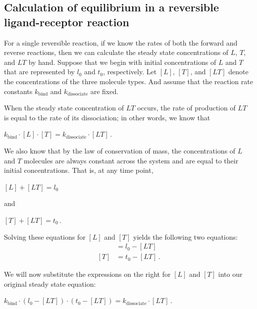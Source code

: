\FloatBarrier
{}
\subsection{Calculation of equilibrium in a reversible ligand-receptor reaction}

For a single reversible reaction, if we know the rates of both the forward and reverse reactions, then we can calculate the steady state concentrations of $L$, $T$, and $LT$ by hand.  Suppose that we begin with initial concentrations of $L$ and $T$ that are represented by $l_0$ and $t_0$, respectively. Let $[L]$, $[T]$, and $[LT]$ denote the concentrations of the three molecule types. And assume that the reaction rate constants $k_\text{bind}$ and $k_\text{dissociate}$ are fixed.

When the steady state concentration of $LT$ occurs, the rate of production of $LT$ is equal to the rate of its dissociation; in other words, we know that

\begin{center}
$k_\text{bind} \cdot [L] \cdot [T] = k_\text{dissociate} \cdot [LT] $\,.

\end{center}

We also know that by the law of conservation of mass, the concentrations of $L$ and $T$ molecules are always constant across the system and are equal to their initial concentrations. That is, at any time point,

\begin{center}
$[L] + [LT] = l_0$
\end{center}

\noindent and

\begin{center}
$[T] + [LT] = t_0 $\,.
\end{center}

\noindent Solving these equations for $[L]$ and $[T]$ yields the following two equations:
\begin{align*}
[L] & = l_0 - [LT]\\
[T] & = t_0 - [LT]\,.
\end{align*}

We will now substitute the expressions on the right for $[L]$ and $[T]$ into our original steady state equation:

\begin{center}
$k_\text{bind} \cdot (l_0 - [LT]) \cdot (t_0 - [LT]) = k_\text{dissociate} \cdot [LT]$\,.
\end{center}

